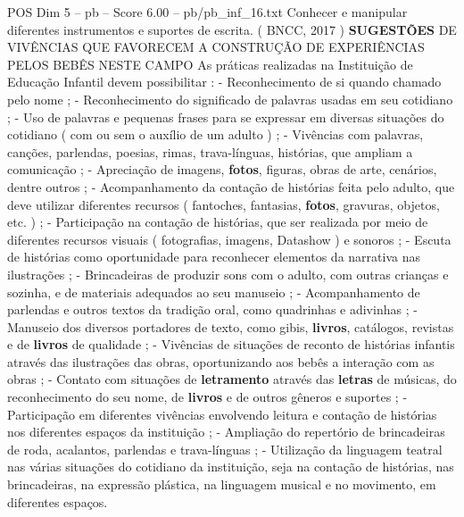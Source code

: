 \begin{textsample}{POS Dim 5 – pb – Score 6.00 – pb/pb\_inf\_16.txt}
Conhecer e manipular diferentes instrumentos e suportes de escrita. ( BNCC, 2017 ) \textbf{SUGESTÕES} DE VIVÊNCIAS QUE FAVORECEM A CONSTRUÇÃO DE EXPERIÊNCIAS PELOS BEBÊS NESTE CAMPO As práticas realizadas na Instituição de Educação Infantil devem possibilitar : - Reconhecimento de si quando chamado pelo nome ; - Reconhecimento do significado de palavras usadas em seu cotidiano ; - Uso de palavras e pequenas frases para se expressar em diversas situações do cotidiano ( com ou sem o auxílio de um adulto ) ; - Vivências com palavras, canções, parlendas, poesias, rimas, trava-línguas, histórias, que ampliam a comunicação ; - Apreciação de imagens, \textbf{fotos}, figuras, obras de arte, cenários, dentre outros ; - Acompanhamento da contação de histórias feita pelo adulto, que deve utilizar diferentes recursos ( fantoches, fantasias, \textbf{fotos}, gravuras, objetos, etc. ) ; - Participação na contação de histórias, que ser realizada por meio de diferentes recursos visuais ( fotografias, imagens, Datashow ) e sonoros ; - Escuta de histórias como oportunidade para reconhecer elementos da narrativa nas ilustrações ; - Brincadeiras de produzir sons com o adulto, com outras crianças e sozinha, e de materiais adequados ao seu manuseio ; - Acompanhamento de parlendas e outros textos da tradição oral, como quadrinhas e adivinhas ; - Manuseio dos diversos portadores de texto, como gibis, \textbf{livros}, catálogos, revistas e de \textbf{livros} de qualidade ; - Vivências de situações de reconto de histórias infantis através das ilustrações das obras, oportunizando aos bebês a interação com as obras ; - Contato com situações de \textbf{letramento} através das \textbf{letras} de músicas, do reconhecimento do seu nome, de \textbf{livros} e de outros gêneros e suportes ; - Participação em diferentes vivências envolvendo leitura e contação de histórias nos diferentes espaços da instituição ; - Ampliação do repertório de brincadeiras de roda, acalantos, parlendas e trava-línguas ; - Utilização da linguagem teatral nas várias situações do cotidiano da instituição, seja na contação de histórias, nas brincadeiras, na expressão plástica, na linguagem musical e no movimento, em diferentes espaços.

\end{textsample}
